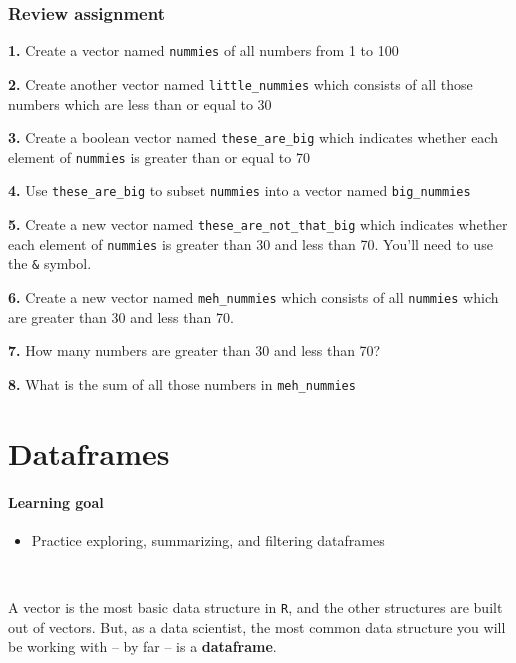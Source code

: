 \documentclass[
]{book}
\providecommand{\tightlist}{%
  \setlength{\itemsep}{0pt}\setlength{\parskip}{0pt}}
\begin{document}
\subsection*{Review assignment}\label{review-assignment}

\textbf{1.} Create a vector named \texttt{nummies} of all numbers from 1 to 100

\textbf{2.} Create another vector named \texttt{little\_nummies} which consists of all those numbers which are less than or equal to 30

\textbf{3.} Create a boolean vector named \texttt{these\_are\_big} which indicates whether each element of \texttt{nummies} is greater than or equal to 70

\textbf{4.} Use \texttt{these\_are\_big} to subset \texttt{nummies} into a vector named \texttt{big\_nummies}

\textbf{5.} Create a new vector named \texttt{these\_are\_not\_that\_big} which indicates whether each element of \texttt{nummies} is greater than 30 and less than 70. You'll need to use the \texttt{\&} symbol.

\textbf{6.} Create a new vector named \texttt{meh\_nummies} which consists of all \texttt{nummies} which are greater than 30 and less than 70.

\textbf{7.} How many numbers are greater than 30 and less than 70?

\textbf{8.} What is the sum of all those numbers in \texttt{meh\_nummies}

\chapter{Dataframes}\label{dataframes}

\subsubsection*{Learning goal}\label{learning-goal}

\begin{itemize}
\tightlist
\item
  Practice exploring, summarizing, and filtering dataframes
\end{itemize}

~

A vector is the most basic data structure in \texttt{R}, and the other structures are built out of vectors. But, as a data scientist, the most common data structure you will be working with -- by far -- is a \textbf{dataframe}.
\end{document}
